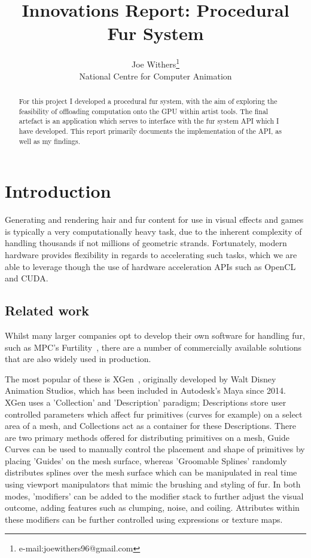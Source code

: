 \documentclass[]{acmsiggraph}
\title{Innovations Report: Procedural Fur System}
\author{Joe Withers\thanks{e-mail:joewithers96@gmail.com}\\National Centre for Computer Animation}
\begin{document}
\maketitle

\begin{abstract}
For this project I developed a procedural fur system, with the aim of exploring the feasibility of offloading computation onto the GPU within artist tools. The final artefact is an application which serves to interface with the fur system API which I have developed. This report primarily documents the implementation of the API, as well as my findings.
\end{abstract}

\section{Introduction} \label{sec:introduction}
Generating and rendering hair and fur content for use in visual effects and games is typically a very computationally heavy task, due to the inherent complexity of handling thousands if not millions of geometric strands. Fortunately, modern hardware provides flexibility in regards to accelerating such tasks, which we are able to leverage though the use of hardware acceleration APIs such as OpenCL and CUDA.

\subsection{Related work} \label{sec:related}
Whilst many larger companies opt to develop their own software for handling fur, such as MPC's Furtility~\cite{furtility}, there are a number of commercially available solutions that are also widely used in production.

The most popular of these is XGen~\cite{xgen}, originally developed by Walt Disney Animation Studios, which has been included in Autodesk's Maya since 2014. XGen uses a 'Collection' and 'Description' paradigm; Descriptions store user controlled parameters which affect fur primitives (curves for example) on a select area of a mesh, and Collections act as a container for these Descriptions. There are two primary methods offered for distributing primitives on a mesh, Guide Curves can be used to manually control the placement and shape of primitives by placing 'Guides' on the mesh surface, whereas 'Groomable Splines' randomly distributes splines over the mesh surface which can be manipulated in real time using viewport manipulators that mimic the brushing and styling of fur. In both modes, 'modifiers' can be added to the modifier stack to further adjust the visual outcome, adding features such as clumping, noise, and coiling. Attributes within these modifiers can be further controlled using expressions or texture maps.
\end{document}
